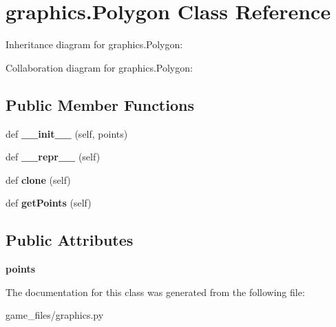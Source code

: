 \hypertarget{classgraphics_1_1Polygon}{}\section{graphics.\+Polygon Class Reference}
\label{classgraphics_1_1Polygon}


Inheritance diagram for graphics.\+Polygon\+:


Collaboration diagram for graphics.\+Polygon\+:
\subsection*{Public Member Functions}
\begin{DoxyCompactItemize}
\item 
def {\bfseries \+\_\+\+\_\+init\+\_\+\+\_\+} (self, points)\hypertarget{classgraphics_1_1Polygon_af9b2f0bcbfecc9d3c2aa5de28c0a3f38}{}\label{classgraphics_1_1Polygon_af9b2f0bcbfecc9d3c2aa5de28c0a3f38}

\item 
def {\bfseries \+\_\+\+\_\+repr\+\_\+\+\_\+} (self)\hypertarget{classgraphics_1_1Polygon_aad12e39fa84c17812be4d1222bf4b33c}{}\label{classgraphics_1_1Polygon_aad12e39fa84c17812be4d1222bf4b33c}

\item 
def {\bfseries clone} (self)\hypertarget{classgraphics_1_1Polygon_aab7a0d81be6f10d4065c9687f5a8b80a}{}\label{classgraphics_1_1Polygon_aab7a0d81be6f10d4065c9687f5a8b80a}

\item 
def {\bfseries get\+Points} (self)\hypertarget{classgraphics_1_1Polygon_a68417042ff193fc01179b274e120d947}{}\label{classgraphics_1_1Polygon_a68417042ff193fc01179b274e120d947}

\end{DoxyCompactItemize}
\subsection*{Public Attributes}
\begin{DoxyCompactItemize}
\item 
{\bfseries points}\hypertarget{classgraphics_1_1Polygon_a3a5ff52b9aef1e15507e2724575da586}{}\label{classgraphics_1_1Polygon_a3a5ff52b9aef1e15507e2724575da586}

\end{DoxyCompactItemize}


The documentation for this class was generated from the following file\+:\begin{DoxyCompactItemize}
\item 
game\+\_\+files/graphics.\+py\end{DoxyCompactItemize}

